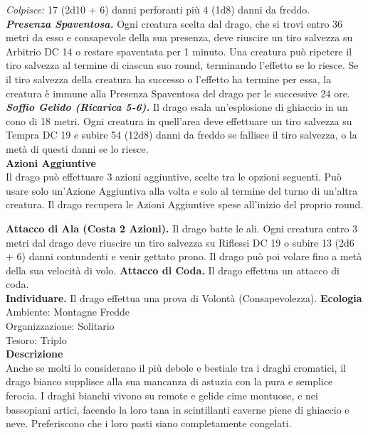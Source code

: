 \begin{multicols}{2}
\emph{Colpisce:} 17 (2d10 + 6) danni perforanti più 4 (1d8) danni da freddo.\\
\emph{\textbf{Presenza Spaventosa.}} Ogni creatura scelta dal drago, che si trovi entro 36 metri da esso e consapevole della sua presenza, deve riuscire un tiro salvezza su Arbitrio DC 14 o restare spaventata per 1 minuto. Una creatura può ripetere il tiro salvezza al termine di ciascun suo round, terminando l'effetto se lo riesce. Se il tiro salvezza della creatura ha successo o l'effetto ha termine per essa, la creatura è immune alla Presenza Spaventosa del drago per le successive 24 ore.\\
\emph{\textbf{Soffio Gelido (Ricarica 5-6).}} Il drago esala un'esplosione di ghiaccio in un cono di 18 metri. Ogni creatura in quell'area deve effettuare un tiro salvezza su Tempra DC 19 e subire 54 (12d8) danni da freddo se fallisce il tiro salvezza, o la metà di questi danni se lo riesce.\\
\textbf{Azioni Aggiuntive} \\
Il drago può effettuare 3 azioni aggiuntive, scelte tra le opzioni seguenti. Può usare solo un'Azione Aggiuntiva alla volta e solo al termine del turno di un'altra creatura. Il drago recupera le Azioni Aggiuntive spese all'inizio del proprio round.

\textbf{Attacco di Ala (Costa 2 Azioni).} Il drago batte le ali. Ogni creatura entro 3 metri dal drago deve riuscire un tiro salvezza su Riflessi DC 19 o subire 13 (2d6 + 6) danni contundenti e venir gettato prono. Il drago può poi volare fino a metà della sua velocità di volo. \textbf{Attacco di Coda.} Il drago effettua un attacco di coda. \\
\textbf{Individuare.} Il drago effettua una prova di Volontà (Consapevolezza).
\textbf{Ecologia}\\
Ambiente: Montagne Fredde\\
Organizzazione: Solitario\\
Tesoro: Triplo\\
\textbf{Descrizione}\\
Anche se molti lo considerano il più debole e bestiale tra i draghi cromatici, il drago bianco supplisce alla sua mancanza di astuzia con la pura e semplice ferocia. I draghi bianchi vivono su remote e gelide cime montuose, e nei bassopiani artici, facendo la loro tana in scintillanti caverne piene di ghiaccio e neve. Preferiscono che i loro pasti siano completamente congelati.\\



\end{multicols}
